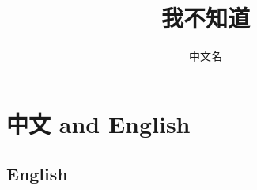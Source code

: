 \documentclass[hyperref,UTF8]{ctexbook}
\author{中文名}
\date{}
\title{我不知道}
\begin{document}
\maketitle
\tableofcontents
\chapter{中文 and English}
\section{English}
\end{document}
